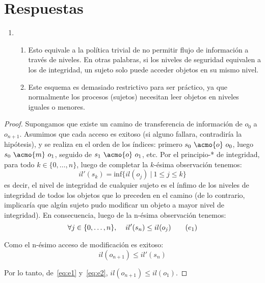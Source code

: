 \section{Respuestas}
\begin{enumerate}
  \item 
    \begin{enumerate}
      \item Esto equivale a la política trivial de no permitir flujo de
        información a través de niveles. En otras palabras, si los niveles de
        seguridad equivalen a los de integridad, un sujeto solo puede acceder
        objetos en su mismo nivel.

      \item Este esquema es demasiado restrictivo para ser práctico, ya que
        normalmente los procesos (sujetos) necesitan leer objetos en niveles
        iguales o menores.
    \end{enumerate}
\end{enumerate}

\begin{proof}
  Supongamos que existe un camino de transferencia de información de $o_0$ a
  $o_{n+1}$. Asumimos que cada acceso es exitoso (si alguno fallara, contradiría la
  hipótesis), y se realiza en el orden de los índices: primero
  $s_0~\acmo{o}~o_0$, luego $s_0~\acmo{m}~o_1$, seguido de $s_1~\acmo{o}~o_1$,
  etc.
  Por el principio-* de integridad, para todo $k \in \{0,\dots,n\}$, luego de completar la $k$-ésima observación
  tenemos:
  \[il'(s_k) = \text{inf} \{ il(o_j)~|~1 \leq j \leq k \}\]
  es decir, el nivel de integridad de cualquier sujeto es el ínfimo de los
  niveles de integridad de todos los objetos que lo preceden en el camino (de lo
  contrario, implicaría que algún sujeto pudo modificar un objeto a mayor nivel
  de integridad). En consecuencia, luego de la n-ésima observación tenemos:
  \[ \forall j \in \{0,\dots, n\},\hspace{.4cm} il'(s_n) \leq il(o_j) \label{eq:e1} \tag{$e_1$} \]
  
  Como el n-ésimo acceso de modificación es exitoso:
  \[ il(o_{n+1}) \leq il'(s_n) \label{eq:e2} \tag{$e_2$} \]
  
  Por lo tanto, de~\eqref{eq:e1} y~\eqref{eq:e2}, $il(o_{n+1}) \leq il(o_1)$.
\end{proof}
